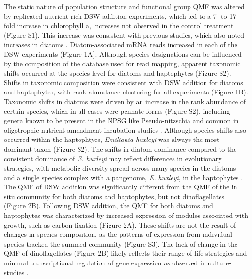 The static nature of population structure and functional group QMF was altered by replicated nutrient-rich DSW addition experiments, which led to a 7- to 17-fold increase in chlorophyll a, increases not observed in the control treatment (Figure S1). This increase was consistent with previous studies, which also noted increases in diatoms \citep{McAndrew2007}. Diatom-associated mRNA reads increased in each of the DSW experiments (Figure 1A). Although species designations can be influenced by the composition of the database used for read mapping, apparent taxonomic shifts occurred at the species-level for diatoms and haptophytes (Figure S2). Shifts in taxonomic composition were consistent with DSW addition for diatoms and haptophytes, with rank abundance clustering for all experiments (Figure 1B).  Taxonomic shifts in diatoms were driven by an increase in the rank abundance of certain species, which in all cases were pennate forms (Figure S2), including genera known to be present in the NPSG like Pseudo-nitzschia \citep{Silver2010} and common in oligotrophic nutrient amendment incubation studies \citep{Marchetti2005, Marchetti2012a}. Although species shifts also occurred within the haptophtyes, \textit{Emiliania huxleyi} was always the most dominant taxon (Figure S2). The shifts in diatom dominance compared to the consistent dominance of \textit{E. huxleyi} may reflect differences in evolutionary strategies, with metabolic diversity spread across many species in the diatoms and a single species complex with a pangenome, \textit{E. huxleyi}, in the haptophytes \citep{Read2013}. The QMF of DSW addition was significantly different from the QMF of the in situ community for both diatoms and haptophytes, but not dinoflagellates (Figure 2B). Following DSW addition, the QMF for both diatoms and haptophytes was characterized by increased expression of modules associated with growth, such as carbon fixation (Figure 2A). These shifts are not the result of changes in species composition, as the patterns of expression from individual species tracked the summed community (Figure S3). The lack of change in the QMF of dinoflagellates (Figure 2B) likely reflects their range of life strategies \citep{Hackett2004} and minimal transcriptional regulation of gene expression as observed in culture-studies \citep{Moustafa2010}. \par
